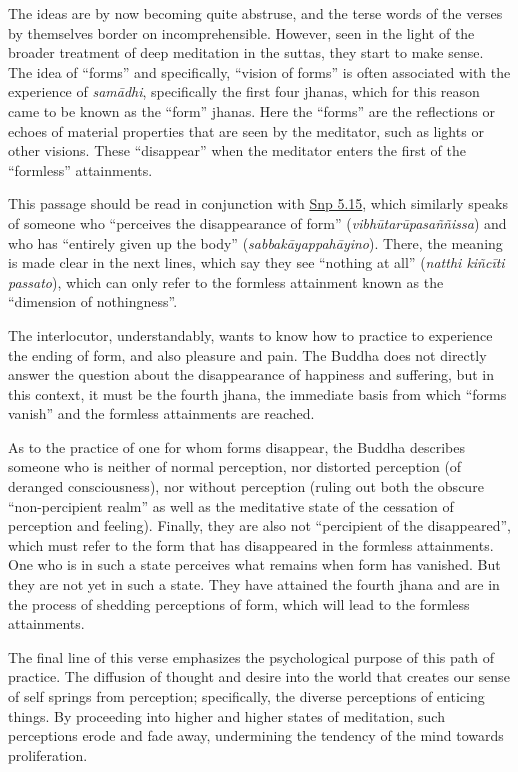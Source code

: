 \documentclass[12pt,openany]{book}%
\begin{document}
The ideas are by now becoming quite abstruse, and the terse words of the verses by themselves border on incomprehensible. However, seen in the light of the broader treatment of deep meditation in the suttas, they start to make sense. The idea of “forms” and specifically, “vision of forms” is often associated with the experience of \textit{\textsanskrit{samādhi}}, specifically the first four jhanas, which for this reason came to be known as the “form” jhanas. Here the “forms” are the reflections or echoes of material properties that are seen by the meditator, such as lights or other visions. These “disappear” when the meditator enters the first of the “formless” attainments.

This passage should be read in conjunction with \href{https://suttacentral.net/snp5.15/en/sujato}{Snp 5.15}, which similarly speaks of someone who “perceives the disappearance of form” (\textit{\textsanskrit{vibhūtarūpasaññissa}}) and who has “entirely given up the body” (\textit{\textsanskrit{sabbakāyappahāyino}}). There, the meaning is made clear in the next lines, which say they see “nothing at all” (\textit{natthi \textsanskrit{kiñcīti} passato}), which can only refer to the formless attainment known as the “dimension of nothingness”.

The interlocutor, understandably, wants to know how to practice to experience the ending of form, and also pleasure and pain. The Buddha does not directly answer the question about the disappearance of happiness and suffering, but in this context, it must be the fourth jhana, the immediate basis from which “forms vanish” and the formless attainments are reached.

As to the practice of one for whom forms disappear, the Buddha describes someone who is neither of normal perception, nor distorted perception (of deranged consciousness), nor without perception (ruling out both the obscure “non-percipient realm” as well as the meditative state of the cessation of perception and feeling). Finally, they are also not “percipient of the disappeared”, which must refer to the form that has disappeared in the formless attainments. One who is in such a state perceives what remains when form has vanished. But they are not yet in such a state. They have attained the fourth jhana and are in the process of shedding perceptions of form, which will lead to the formless attainments.

The final line of this verse emphasizes the psychological purpose of this path of practice. The diffusion of thought and desire into the world that creates our sense of self springs from perception; specifically, the diverse perceptions of enticing things. By proceeding into higher and higher states of meditation, such perceptions erode and fade away, undermining the tendency of the mind towards proliferation.
\end{document}
